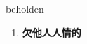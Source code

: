 
\begin{frame}
{\huge beholden}
\begin{center}
\begin{enumerate}\Large
  \item \textbf{欠他人人情的}
\end{enumerate}
\end{center}
\end{frame}

